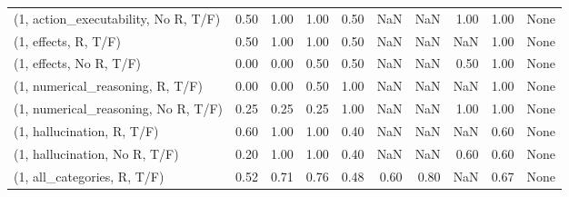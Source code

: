 \begin{table*}[h!]
\begin{adjustbox}{width=2\columnwidth,center}
\begin{tabular}{lrrr|rrr|rrr}
(1, action\_executability, No R, T/F) &                      0.50 &                  1.00 &                      1.00 &                          0.50 &                       NaN &                           NaN &                                   1.00 &                               1.00 &                                  None \\
(1, effects, R, T/F)                 &                      0.50 &                  1.00 &                      1.00 &                          0.50 &                       NaN &                           NaN &                                    NaN &                               1.00 &                                  None \\
(1, effects, No R, T/F)              &                      0.00 &                  0.00 &                      0.50 &                          0.50 &                       NaN &                           NaN &                                   0.50 &                               1.00 &                                  None \\
(1, numerical\_reasoning, R, T/F)     &                      0.00 &                  0.00 &                      0.50 &                          1.00 &                       NaN &                           NaN &                                    NaN &                               1.00 &                                  None \\
(1, numerical\_reasoning, No R, T/F)  &                      0.25 &                  0.25 &                      0.25 &                          1.00 &                       NaN &                           NaN &                                   1.00 &                               1.00 &                                  None \\
(1, hallucination, R, T/F)           &                      0.60 &                  1.00 &                      1.00 &                          0.40 &                       NaN &                           NaN &                                    NaN &                               0.60 &                                  None \\
(1, hallucination, No R, T/F)        &                      0.20 &                  1.00 &                      1.00 &                          0.40 &                       NaN &                           NaN &                                   0.60 &                               0.60 &                                  None \\
(1, all\_categories, R, T/F)          &                      0.52 &                  0.71 &                      0.76 &                          0.48 &                      0.60 &                          0.80 &                                    NaN &                               0.67 &                                  None \\

\end{tabular}
\end{adjustbox}
\end{table*}
